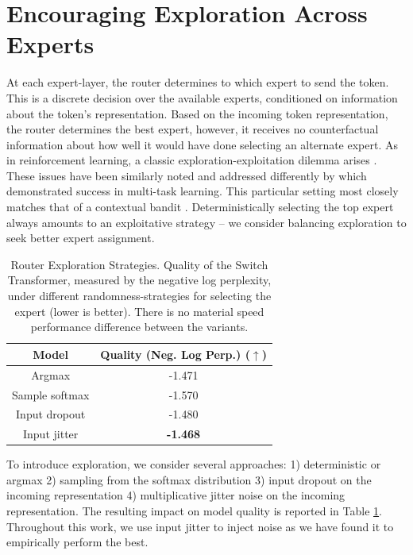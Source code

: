 \documentclass[twoside,11pt]{article}
\begin{document}
\section{Encouraging Exploration Across Experts}
At each expert-layer, the router determines to which expert to send the token.
This is a discrete decision over the available experts, conditioned on information about the token's representation.
Based on the incoming token representation, the router determines the best expert, however, it receives no counterfactual information about how well it would have done selecting an alternate expert.
As in reinforcement learning, a classic exploration-exploitation dilemma arises \citep{sutton2018reinforcement}.
These issues have been similarly noted and addressed differently by \cite{rosenbaum2017routing} which demonstrated success in multi-task learning.
This particular setting most closely matches that of a contextual bandit \citep{robbins1952some}.
Deterministically selecting the top expert always amounts to an exploitative strategy -- we consider balancing exploration to seek better expert assignment.

\begin{center}
\begin{table}[ht!]
\centering
\begin{tabular}{cc}
    \toprule
    {Model} & {Quality (Neg. Log Perp.) ($\uparrow$)}\\ \hline
    Argmax  & -1.471 \\ 
    Sample softmax  & -1.570 \\ 
    Input dropout  & -1.480 \\ 
    Input jitter  & \textbf{-1.468} \\ 
    \bottomrule
\end{tabular}
\caption{Router Exploration Strategies. Quality of the Switch Transformer, measured by the negative log perplexity, under different randomness-strategies for selecting the expert (lower is better). There is no material speed performance difference between the variants.}
\label{tab: top1_noise}
\end{table}
\end{center}

To introduce exploration, we consider several approaches: 1) deterministic or argmax 2) sampling from the softmax distribution 3) input dropout on the incoming representation 4) multiplicative jitter noise on the incoming representation.
The resulting impact on model quality is reported in Table \ref{tab: top1_noise}.
Throughout this work, we use input jitter to inject noise as we have found it to empirically perform the best.
\end{document}
